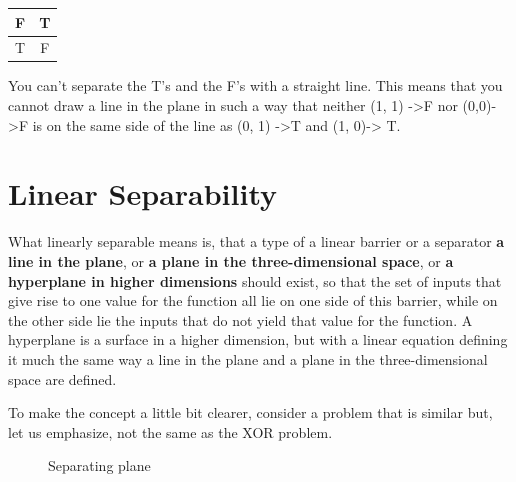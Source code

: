 \documentclass[12pt, right open]{memoir}
\begin{document}
\begin{tabular}{|c|c|}
\hline
F & T \\ \hline
T & F \\ \hline
\end{tabular}

You can’t separate the T’s and the F’s with a straight line. This means that you cannot draw a line in the plane in such a way that neither (1, 1) ->F nor (0,0)->F is on the same side of the line as (0, 1) ->T and (1, 0)-> T.

\section{Linear Separability}
What linearly separable means is, that a type of a linear barrier or a
separator \textbf{a line in the plane}, or \textbf{a plane in the three-dimensional space}, or \textbf{a hyperplane in higher dimensions} should exist, so that the set of inputs that give rise to one value for the function all lie on one side of this barrier, while on the other side lie the inputs that do not yield that value for the function. A hyperplane is a surface in a higher dimension, but with a linear equation defining it much the same way a line in the plane and a plane in the three-dimensional space are defined.

To make the concept a little bit clearer, consider a problem that is similar but, let us emphasize, not the same as the XOR problem.

\newcommand{\Depth}{4}
\newcommand{\Height}{4}
\newcommand{\Width}{4}
\begin{figure}
\centering
\caption{Separating plane}
\label{fig:separating_plane}
\end{figure}
\end{document}
